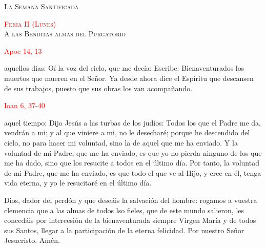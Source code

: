 \documentclass[10pt]{article}
\begin{document}
\begin{center}
      \textsc{\Large La Semana Santificada}
\end{center}

\begin{multicols}{2}


      \begin{center}
            \textsc{\textcolor{red}{Feria II (Lunes)}\\ {\large A las Benditas almas del Purgatorio}}
      \end{center}

      \hfill\textcolor{red}{Apoc 14, 13}

      aquellos días: Oí la voz del cielo, que me decía: Escribe: Bienaventurados los muertos que mueren en el Señor. Ya desde ahora dice el Espíritu que descansen
      de sus trabajos, puesto que sus obras los van acompañando.

      \vspace{2mm}

      \hfill\textcolor{red}{Ioan 6, 37-40}

      aquel tiempo: Dijo Jesús a las turbas de los judíos: Todos los que el Padre me da, vendrán a mi; y al que viniere a mi, no le desecharé; porque he descendido
      del cielo, no para hacer mi voluntad, sino la de aquel que me ha enviado. Y la voluntad de mi Padre, que me ha enviado, es que yo no pierda ninguno de los que
      me ha dado, sino que los resucite a todos en el último día. Por tanto, la voluntad de mi Padre, que me ha enviado, es que todo el que ve al Hijo, y cree en él,
      tenga vida eterna, y yo le resucitaré en el último día.

      \vspace{2mm}

      \begin{otherlanguage}{latin}
            

            \vspace{1mm}

            
      \end{otherlanguage}

      \vspace{2mm}

      Dios, dador del perdón y que deseáis la salvación del hombre: rogamos a vuestra clemencia que a las almas de todos lso fieles, que de este mundo salieron,
      les concedáis por intercesión de la bienaventurada siempre Virgen María y de todos sus Santos, llegar a la participación de la eterna felicidad. Por nuestro
      Señor Jesucristo. Amén.
      

\end{multicols}
\end{document}
